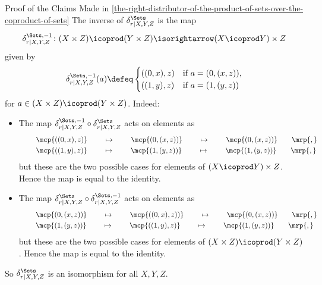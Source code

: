 \begin{Proof}{Proof of the Claims Made in \cref{the-right-distributor-of-the-product-of-sets-over-the-coproduct-of-sets}}%
  The inverse of $\delta^{\Sets}_{r|X,Y,Z}$ is the map
  \[\delta^{\Sets,-1}_{r|X,Y,Z}%
        \colon%

        (X\times Z)\icoprod(Y\times Z)
        \isorightarrow
        (X\icoprod Y)\times Z\]
      given by
      \[\delta^{\Sets,-1}_{r|X,Y,Z}(a) \defeq
        \begin{cases}
            ((0,x),z) &\text{if $a=(0,(x,z))$,}\\
            ((1,y),z) &\text{if $a=(1,(y,z))$}\
        \end{cases} \]
      for $a \in (X\times Z)\icoprod(Y\times Z)$. Indeed:
     \begin{itemize}
       \item{}The map
             $\delta^{\Sets,-1}_{r|X,Y,Z} \circ \delta^{\Sets}_{r|X,Y,Z}$ acts on elements as
            \begin{align*}
                &\mkern40mu\mcp{((0,x),z)}\mkern40mu \mapsto \mkern40mu\mcp{(0,(x,z))}    \mkern40mu \mapsto \mkern40mu\mcp{(0,(x,z))}\mkern35mu\mrp{,}\\
                &\mkern40mu\mcp{((1,y),z)}\mkern40mu \mapsto \mkern40mu\mcp{(1,(y,z))}\mkern40mu \mapsto \mkern40mu\mcp{(1,(y,z))}\mkern35mu\mrp{,}\\
            \end{align*}
            but these are the two possible cases for elements of $(X \icoprod Y) \times Z$. Hence the map is equal to the identity.
        \item\SloganFont{Invertibility \rmII. }The map
             $\delta^{\Sets}_{r|X,Y,Z} \circ \delta^{\Sets,-1}_{r|X,Y,Z}$ acts on elements as
            \begin{align*}
                &\mkern40mu\mcp{(0,(x,z))}\mkern40mu \mapsto \mkern40mu\mcp{((0,x),z))}    \mkern40mu \mapsto \mkern40mu\mcp{(0,(x,z))}\mkern35mu\mrp{,}\\
                &\mkern40mu\mcp{(1,(y,z))}\mkern40mu \mapsto \mkern40mu\mcp{((1,y),z)}\mkern40mu \mapsto \mkern40mu\mcp{(1,(y,z))}\mkern35mu\mrp{,}\\
            \end{align*}
            but these are the two possible cases for elements of $(X \times Z) \icoprod (Y \times Z)$. Hence the map is equal to the identity.
     \end{itemize}
     So $\delta^{\Sets}_{r|X,Y,Z}$ is an isomorphism for all $X,Y,Z$.


\end{Proof}
